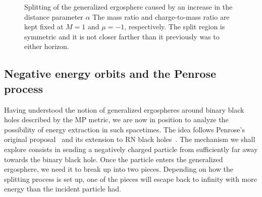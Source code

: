 \begin{figure}[!htbp]
    \centering
    \caption{Splitting of the generalized ergosphere caused by an increase in the distance parameter $\alpha$ The mass ratio and charge-to-mass ratio are kept fixed at $M = 1$ and $\mu = -1$, respectively. The split region is symmetric and it is not closer farther than it previously was to either horizon.}
    \label{ch:penrose_binaries/fig:splitting_ergosphere_distance_increase}
\end{figure}

\subsection{Negative energy orbits and the Penrose process}

Having understood the notion of generalized ergospheres around binary black holes described by the MP metric, we are now in position to analyze the possibility of energy extraction in such spacetimes. The idea follows Penrose's original proposal~\cite{PENROSE1971} and its extension to RN black holes~\cite{RUFFINI1971,DENARDO1973}. The mechanism we shall explore consists in sending a negatively charged particle from sufficiently far away towards the binary black hole.  Once the particle enters the generalized ergosphere, we need it to break up into two pieces. Depending on how the splitting process is set up, one of the pieces will escape back to infinity with more energy than the incident particle had.

